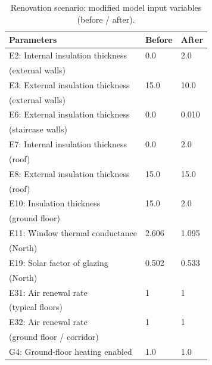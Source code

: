 \documentclass{article}
\begin{document}
\begin{table}[H]
\centering
\caption{Renovation scenario: modified model input variables (before / after).}
\label{tab:renovation_inputs}
\scriptsize
\begin{tabular}{lll}
\toprule
Parameters & Before & After \\
\midrule
E2: Internal insulation thickness   & 0.0   & 2.0 \\ \hspace{0.5cm}(external walls)\\
E3: External insulation thickness  & 15.0  & 10.0 \\ \hspace{0.5cm}(external walls)\\
E6: External insulation thickness   & 0.0   & 0.010 \\ \hspace{0.5cm}(staircase walls)\\
E7: Internal insulation thickness   & 0.0   & 2.0 \\ \hspace{0.5cm}(roof)\\
E8: External insulation thickness   & 15.0  & 15.0 \\ \hspace{0.5cm}(roof)\\
E10: Insulation thickness  & 15.0  & 2.0 \\ \hspace{0.5cm}(ground floor)\\
E11: Window thermal conductance  & 2.606 & 1.095 \\ \hspace{0.5cm}(North) \\
E19: Solar factor of glazing   & 0.502 & 0.533 \\ \hspace{0.5cm}(North) \\
E31: Air renewal rate  & 1     & 1 \\ \hspace{0.5cm}(typical floors)\\
E32: Air renewal rate  & 1     & 1 \\ \hspace{0.5cm}(ground floor / corridor)\\
G4: Ground-floor heating enabled  & 1.0   & 1.0 \\
\bottomrule
\end{tabular}
\end{table}
\end{document}
